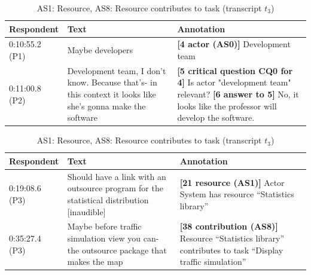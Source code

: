 \documentclass[11.5pt,two column]{llncs}
\begin{document}
\begin{table}[!htbp]
\centering
\begin{tabular}{|p{20mm}|p{70mm}|p{60mm}|}
\hline
Respondent & Text & Annotation\\
\hline
0:10:55.2 (P1) & Maybe developers &\textbf{[4 actor (AS0)]} Development team\\
\hline
0:11:00.8 (P2) & Development team, I don't know. Because that's- in this context it looks like she's gonna make the software & \textbf{[5 critical question CQ0 for 4]} Is actor "development team" relevant?\newline
\textbf{[6 answer to 5]} No, it looks like the professor will develop the software.\\
\hline
\end{tabular}
\caption{AS0: Actor, CQ0: Relevant actor? (transcript $t_3$)}
\label{table:transcript:as0-cq0}

\begin{tabular}{|p{20mm}|p{70mm}|p{60mm}|}
\hline
Respondent & Text & Annotation\\
\hline
0:19:08.6 (P3) & Should have a link with an outsource program for the statistical distribution [inaudible] & \textbf{[21 resource (AS1)]} Actor System has resource ``Statistics library''\\
\hline
0:35:27.4 (P3) & Maybe before traffic simulation view you can- the outsource package that makes the map	& \textbf{[38 contribution (AS8)]} Resource ``Statistics library'' contributes to task ``Display traffic simulation''\\
\hline
\end{tabular}
\caption{AS1: Resource, AS8: Resource contributes to task (transcript $t_3$)}
\label{table:transcript:as1-as8}


\end{table}
\end{document}
